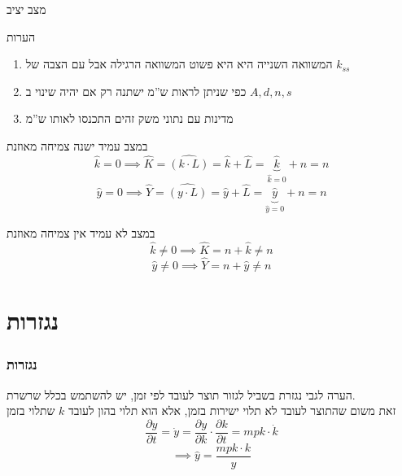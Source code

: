 \documentclass[usenames,dvipsnames]{beamer}
\begin{document}
\begin{RTL}
\begin{frame}[allowframebreaks]
\begin{block}{מצב יציב}
    \end{block}
    
    \begin{alertblock}{הערות}
        \begin{enumerate}
            \item המשוואה השנייה היא היא פשוט המשוואה הרגילה אבל עם הצבה של $k_{ss}$
            \item כפי שניתן לראות ש''מ ישתנה רק אם יהיה שינוי ב $A,d,n,s$
            \item מדינות עם נתוני משק זהים התכנסו לאותו ש''מ
        \end{enumerate}
    \end{alertblock}
    \framebreak
    \begin{block}{במצב עמיד ישנה צמיחה מאוזנת}
        \begin{equation*}
            \hat k = 0  \implies \hat K = \widehat{ \left (k \cdot L \right )} = \hat k + \hat L = \underbrace{\hat k}_{\hat k = 0} + n = n
        \end{equation*}
        \begin{equation*}
            \hat y = 0 \implies \hat{Y} = \widehat{ \left (y \cdot L \right )} = \hat y + \hat L = \underbrace{\hat y}_{\hat y = 0} + n = n
        \end{equation*}
        
        
    \end{block}

    \begin{alertblock}{במצב לא עמיד אין צמיחה מאוזנת}
        \begin{equation*}
            \hat k \ne 0  \implies \hat K = n + \hat k \ne n
        \end{equation*}
        \begin{equation*}
            \hat y \ne 0 \implies \hat{Y} = n + \hat y \ne n
        \end{equation*}
    \end{alertblock}
\end{frame}

\section{נגזרות}

\begin{frame}
    \frametitle{נגזרות}
    \begin{alertblock}{הערה לגבי נגזרת}
        בשביל לגזור תוצר לעובד לפי זמן, יש להשתמש בכלל שרשרת. \\
        זאת משום שהתוצר לעובד לא תלוי ישירות בזמן, אלא הוא תלוי בהון לעובד $k$ שתלוי בזמן
        \begin{equation*}
            \frac{\partial y}{\partial t} = \dot y = \frac{\partial y}{\partial k } \cdot \frac{\partial k}{\partial t} = mpk \cdot \dot k 
        \end{equation*}
        $$\implies \hat y = \frac{mpk \cdot k }{y}$$
    \end{alertblock}
    


\end{frame}
\end{RTL}
\end{document}
